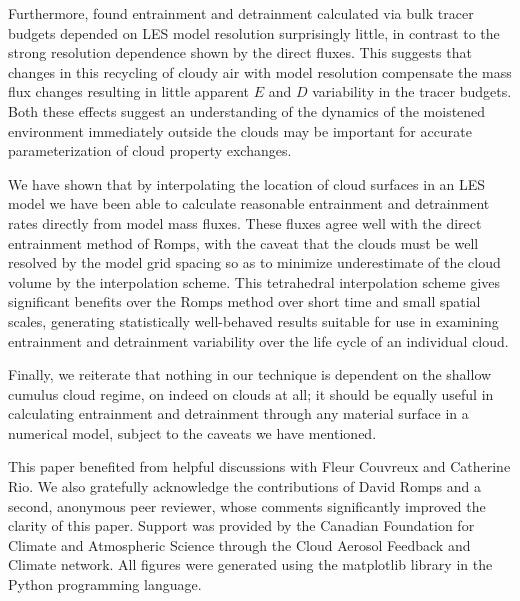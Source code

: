 \documentclass[12pt]{article}
\begin{document}
Furthermore, \cite{Brown1999} found entrainment and detrainment calculated via
bulk tracer budgets depended on LES model resolution surprisingly little, in 
contrast to the strong resolution dependence shown by the direct fluxes.
This suggests that changes in this recycling of cloudy air with model 
resolution compensate the mass flux changes resulting in little apparent $E$ 
and $D$ variability in the tracer budgets.  Both these effects suggest an 
understanding of the dynamics of the moistened environment immediately outside 
the clouds may be important for accurate parameterization of cloud property 
exchanges.

We have shown that by interpolating the location of cloud surfaces in an LES
model we have been able to calculate reasonable entrainment and detrainment 
rates directly from model mass fluxes.  These fluxes agree well with the 
direct entrainment method of Romps, with the caveat that the clouds must be 
well resolved by the model grid spacing so as to minimize underestimate of the 
cloud volume by the interpolation scheme.  This tetrahedral interpolation 
scheme gives significant benefits over the Romps method over short time and 
small spatial scales, generating statistically well-behaved results suitable 
for use in examining entrainment and detrainment variability over the life 
cycle of an individual cloud.

Finally, we reiterate that nothing in our technique is dependent on the shallow 
cumulus cloud regime, on indeed on clouds at all; it should be equally useful
in calculating entrainment and detrainment through any material surface in a 
numerical model, subject to the caveats we have mentioned.



\begin{acknowledgment}
This paper benefited from helpful discussions with Fleur Couvreux and 
Catherine Rio.  We also gratefully acknowledge the contributions of David 
Romps and a second, anonymous peer reviewer, whose comments significantly 
improved the clarity of this paper.  Support was provided by the Canadian 
Foundation for Climate and Atmospheric Science through the Cloud Aerosol 
Feedback and Climate network.  All figures were generated using the matplotlib 
library in the Python programming language.
\end{acknowledgment}

\end{document}
